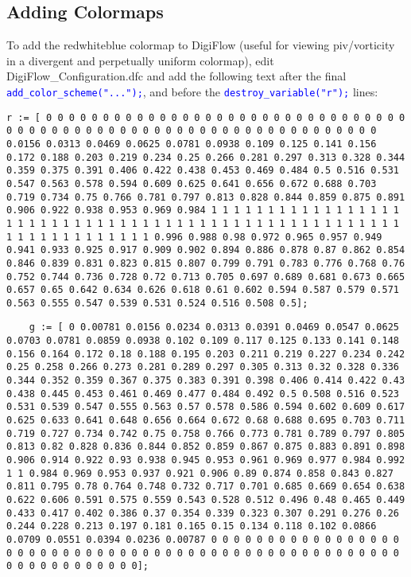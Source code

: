 \documentclass{article}
\newcommand{\Files}[1]{\textcolor{myblue}{#1}}
\newcommand{\Interpreter}[1]{\textcolor{blue}{\texttt{#1}}}
\begin{document}
\subsection{Adding Colormaps}
To add the redwhiteblue colormap to DigiFlow (useful for viewing piv/vorticity in a divergent and perpetually uniform colormap), edit \Files{DigiFlow\_Configuration.dfc} and add the following text after the final \Interpreter{add\_color_scheme("...");}, and before the \Interpreter{destroy\_variable("r");} lines:
\begin{lstlisting}
r := [ 0 0 0 0 0 0 0 0 0 0 0 0 0 0 0 0 0 0 0 0 0 0 0 0 0 0 0 0 0 0 0 0 0 0 0 0 0 0 0 0 0 0 0 0 0 0 0 0 0 0 0 0 0 0 0 0 0 0 0 0 0 0 0 0 0 0.0156 0.0313 0.0469 0.0625 0.0781 0.0938 0.109 0.125 0.141 0.156 0.172 0.188 0.203 0.219 0.234 0.25 0.266 0.281 0.297 0.313 0.328 0.344 0.359 0.375 0.391 0.406 0.422 0.438 0.453 0.469 0.484 0.5 0.516 0.531 0.547 0.563 0.578 0.594 0.609 0.625 0.641 0.656 0.672 0.688 0.703 0.719 0.734 0.75 0.766 0.781 0.797 0.813 0.828 0.844 0.859 0.875 0.891 0.906 0.922 0.938 0.953 0.969 0.984 1 1 1 1 1 1 1 1 1 1 1 1 1 1 1 1 1 1 1 1 1 1 1 1 1 1 1 1 1 1 1 1 1 1 1 1 1 1 1 1 1 1 1 1 1 1 1 1 1 1 1 1 1 1 1 1 1 1 1 1 1 1 1 1 1 0.996 0.988 0.98 0.972 0.965 0.957 0.949 0.941 0.933 0.925 0.917 0.909 0.902 0.894 0.886 0.878 0.87 0.862 0.854 0.846 0.839 0.831 0.823 0.815 0.807 0.799 0.791 0.783 0.776 0.768 0.76 0.752 0.744 0.736 0.728 0.72 0.713 0.705 0.697 0.689 0.681 0.673 0.665 0.657 0.65 0.642 0.634 0.626 0.618 0.61 0.602 0.594 0.587 0.579 0.571 0.563 0.555 0.547 0.539 0.531 0.524 0.516 0.508 0.5]; 
\end{lstlisting}
\begin{lstlisting}
    g := [ 0 0.00781 0.0156 0.0234 0.0313 0.0391 0.0469 0.0547 0.0625 0.0703 0.0781 0.0859 0.0938 0.102 0.109 0.117 0.125 0.133 0.141 0.148 0.156 0.164 0.172 0.18 0.188 0.195 0.203 0.211 0.219 0.227 0.234 0.242 0.25 0.258 0.266 0.273 0.281 0.289 0.297 0.305 0.313 0.32 0.328 0.336 0.344 0.352 0.359 0.367 0.375 0.383 0.391 0.398 0.406 0.414 0.422 0.43 0.438 0.445 0.453 0.461 0.469 0.477 0.484 0.492 0.5 0.508 0.516 0.523 0.531 0.539 0.547 0.555 0.563 0.57 0.578 0.586 0.594 0.602 0.609 0.617 0.625 0.633 0.641 0.648 0.656 0.664 0.672 0.68 0.688 0.695 0.703 0.711 0.719 0.727 0.734 0.742 0.75 0.758 0.766 0.773 0.781 0.789 0.797 0.805 0.813 0.82 0.828 0.836 0.844 0.852 0.859 0.867 0.875 0.883 0.891 0.898 0.906 0.914 0.922 0.93 0.938 0.945 0.953 0.961 0.969 0.977 0.984 0.992 1 1 0.984 0.969 0.953 0.937 0.921 0.906 0.89 0.874 0.858 0.843 0.827 0.811 0.795 0.78 0.764 0.748 0.732 0.717 0.701 0.685 0.669 0.654 0.638 0.622 0.606 0.591 0.575 0.559 0.543 0.528 0.512 0.496 0.48 0.465 0.449 0.433 0.417 0.402 0.386 0.37 0.354 0.339 0.323 0.307 0.291 0.276 0.26 0.244 0.228 0.213 0.197 0.181 0.165 0.15 0.134 0.118 0.102 0.0866 0.0709 0.0551 0.0394 0.0236 0.00787 0 0 0 0 0 0 0 0 0 0 0 0 0 0 0 0 0 0 0 0 0 0 0 0 0 0 0 0 0 0 0 0 0 0 0 0 0 0 0 0 0 0 0 0 0 0 0 0 0 0 0 0 0 0 0 0 0 0 0 0 0 0 0 0];
\end{lstlisting} 
\end{document}
